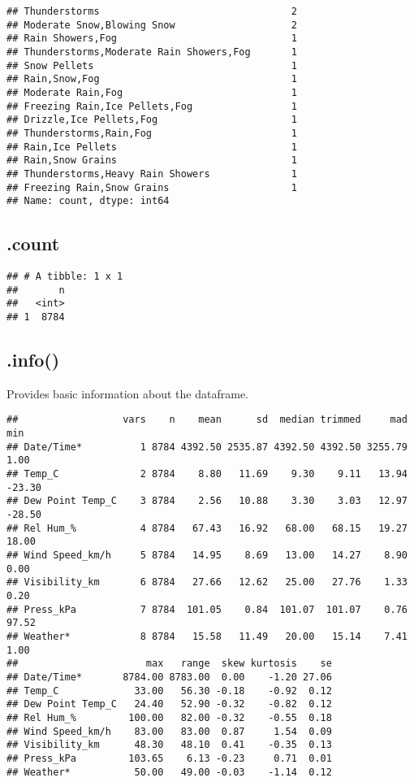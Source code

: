 \documentclass[
]{article}
\begin{document}
\begin{verbatim}
## Thunderstorms                                 2
## Moderate Snow,Blowing Snow                    2
## Rain Showers,Fog                              1
## Thunderstorms,Moderate Rain Showers,Fog       1
## Snow Pellets                                  1
## Rain,Snow,Fog                                 1
## Moderate Rain,Fog                             1
## Freezing Rain,Ice Pellets,Fog                 1
## Drizzle,Ice Pellets,Fog                       1
## Thunderstorms,Rain,Fog                        1
## Rain,Ice Pellets                              1
## Rain,Snow Grains                              1
## Thunderstorms,Heavy Rain Showers              1
## Freezing Rain,Snow Grains                     1
## Name: count, dtype: int64
\end{verbatim}

\hypertarget{count}{%
\subsection{.count}\label{count}}

\begin{verbatim}
## # A tibble: 1 x 1
##       n
##   <int>
## 1  8784
\end{verbatim}

\hypertarget{info}{%
\subsection{.info()}\label{info}}

Provides basic information about the dataframe.

\begin{verbatim}
##                  vars    n    mean      sd  median trimmed     mad    min
## Date/Time*          1 8784 4392.50 2535.87 4392.50 4392.50 3255.79   1.00
## Temp_C              2 8784    8.80   11.69    9.30    9.11   13.94 -23.30
## Dew Point Temp_C    3 8784    2.56   10.88    3.30    3.03   12.97 -28.50
## Rel Hum_%           4 8784   67.43   16.92   68.00   68.15   19.27  18.00
## Wind Speed_km/h     5 8784   14.95    8.69   13.00   14.27    8.90   0.00
## Visibility_km       6 8784   27.66   12.62   25.00   27.76    1.33   0.20
## Press_kPa           7 8784  101.05    0.84  101.07  101.07    0.76  97.52
## Weather*            8 8784   15.58   11.49   20.00   15.14    7.41   1.00
##                      max   range  skew kurtosis    se
## Date/Time*       8784.00 8783.00  0.00    -1.20 27.06
## Temp_C             33.00   56.30 -0.18    -0.92  0.12
## Dew Point Temp_C   24.40   52.90 -0.32    -0.82  0.12
## Rel Hum_%         100.00   82.00 -0.32    -0.55  0.18
## Wind Speed_km/h    83.00   83.00  0.87     1.54  0.09
## Visibility_km      48.30   48.10  0.41    -0.35  0.13
## Press_kPa         103.65    6.13 -0.23     0.71  0.01
## Weather*           50.00   49.00 -0.03    -1.14  0.12
\end{verbatim}
\end{document}
